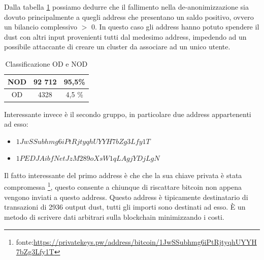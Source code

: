 Dalla tabella \ref{tab:OD_NOD_failed} possiamo dedurre che il fallimento nella de-anonimizzazione sia dovuto principalmente a quegli address che presentano un saldo positivo, ovvero un bilancio complessivo $>$ 0. In questo caso gli address hanno potuto spendere il dust con altri input provenienti tutti dal medesimo address, impedendo ad un possibile attaccante di creare un cluster da associare ad un unico utente.
\begin{table}[H]
    \centering
    \begin{tabular}{|c|c|c|}
        \hline
            NOD  & 92 712 & 95,5\%\\
        \hline 
            OD  & 4328 & 4,5 \%\\
        \hline
    \end{tabular}
    \caption{Classificazione OD e NOD}
    \label{tab:OD_NOD_failed}
\end{table}
Interessante invece è il secondo gruppo, in particolare due address appartenenti ad esso:
\begin{itemize}
    \item $1JwSSubhmg6iPtRjtyqhUYYH7bZg3Lfy1T$
    \item $1PEDJAibfNetJzM289oXsW1qLAgjYDjLgN$
\end{itemize}

Il fatto interessante del primo address è che che la sua chiave privata è stata compromessa \footnote{fonte:\url{https://privatekeys.pw/address/bitcoin/1JwSSubhmg6iPtRjtyqhUYYH7bZg3Lfy1T}}, questo consente a chiunque di riscattare bitcoin non appena vengono inviati a questo address. Questo address è tipicamente destinatario di transazioni di 2936 output dust, tutti gli importi sono destinati ad esso. È un metodo di scrivere dati arbitrari sulla blockchain minimizzando i costi.

